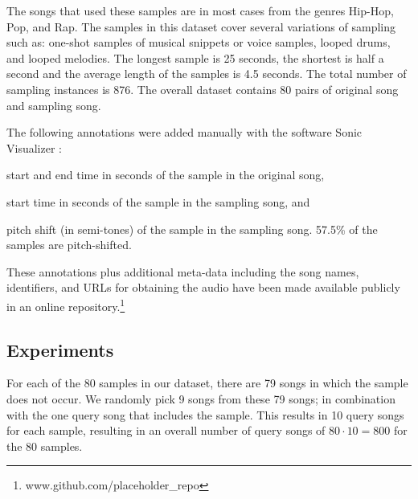 \documentclass{article}
\begin{document}
    The songs that used these samples are in most cases from the genres Hip-Hop, Pop, and Rap. The samples in this dataset cover several variations of sampling such as: one-shot samples of musical snippets or voice samples, looped drums, and looped melodies. The longest sample is 25 seconds, the shortest is half a second and the average length of the samples is 4.5 seconds. The total number of sampling instances is 876.%
The overall dataset contains 80 pairs of original song and sampling song.

The following annotations were added manually with the software Sonic Visualizer \cite{SonicVisualiser}:
\begin{inparaenum}[(i)]
    \item   start and end time in seconds of the sample in the original song,
    \item   start time in seconds of the sample in the sampling song, and
    \item   pitch shift (in semi-tones) of the sample in the sampling song. 57.5\% of the samples are pitch-shifted.
\end{inparaenum}

These annotations plus additional meta-data including the song names, identifiers, and URLs for obtaining the audio have been made available publicly in an online repository.\footnote{www.github.com/placeholder\_repo}

\subsection{Experiments}
\label{exp}
For each of the 80 samples in our dataset, there are 79 songs in which the sample does not occur. We randomly pick 9 songs from these 79 songs; in combination with the one query song that includes the sample. This results in 10 query songs for each sample, resulting in an overall number of query songs of $80\cdot10 = 800$ for the $80$ samples.
\end{document}
